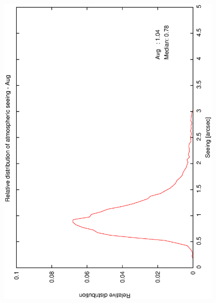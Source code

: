 {{\begin{figure}[htbp]
\begin{center}
{   \includegraphics[scale=0.25, angle=-90]{figures/ecs/corr_see_dist_aug.eps}
  }
 \subfigure[] {
   \label{fig:see_dist_sep}
}
\end{center}
\end{figure}}}
